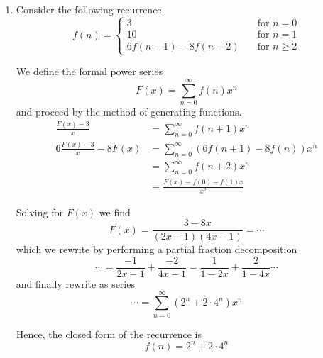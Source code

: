 \documentclass[11pt]{article}
\begin{document}
\begin{enumerate}
    \item
        Consider the following recurrence.
        \begin{equation*}
            f(n) = \begin{cases}
                3   &\quad\text{for } n = 0 \\
                10  &\quad\text{for } n = 1 \\
                6f(n-1) - 8f(n-2)
                    &\quad\text{for } n \geq 2
            \end{cases}
        \end{equation*}

        We define the formal power series
        \begin{equation*}
            F(x) = \sum_{n=0}^\infty f(n)x^n
        \end{equation*}
        and proceed by the method of generating functions.
        \begin{align*}
            \frac{F(x) - 3}{x} &= \sum_{n=0}^\infty f(n+1) x^n \\
            6 \frac{F(x) - 3}{x} - 8 F(x)
                &= \sum_{n=0}^\infty (6 f(n+1) - 8 f(n)) x^n \\
                &= \sum_{n=0}^\infty f(n+2) x^n \\
                &= \frac{F(x) - f(0) - f(1) x}{x^2}
        \end{align*}

        Solving for $F(x)$ we find
        \begin{equation*}
            F(x) = \frac{3 - 8x}{(2x-1)(4x-1)} = \cdots
        \end{equation*}
        which we rewrite by performing a partial fraction decomposition
        \begin{equation*}
            \cdots
            =
            \frac{-1}{2x-1} + \frac{-2}{4x - 1}
            =
            \frac{1}{1-2x} + \frac{2}{1-4x}
            \cdots
        \end{equation*}
        and finally rewrite as series
        \begin{equation*}
            \cdots
            =
            \sum_{n=0}^\infty{
                (2^n + 2 \cdot 4^n)x^n
            }
        \end{equation*}

        Hence, the closed form of the recurrence is
        \begin{equation*}
            f(n) = 2^n + 2 \cdot 4^n
        \end{equation*}


\end{enumerate}
\end{document}
